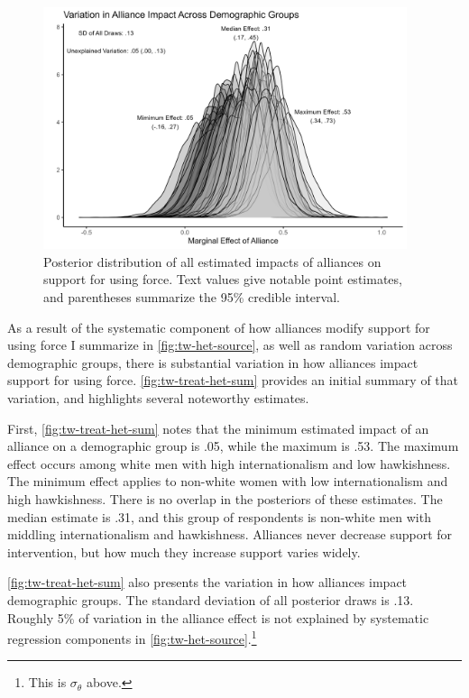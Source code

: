\documentclass[12pt]{article}
\begin{document}
\begin{figure}[htpb]
	\centering
		\includegraphics[width=0.95\textwidth]{../figures/tw-treat-het-sum.png}
	\caption{Posterior distribution of all estimated impacts of alliances on support for using force. Text values give notable point estimates, and parentheses summarize the 95\% credible interval.}
	\label{fig:tw-treat-het-sum}
\end{figure}


As a result of the systematic component of how alliances modify support for using force I summarize in \autoref{fig:tw-het-source}, as well as random variation across demographic groups, there is substantial variation in how alliances impact support for using force. 
\autoref{fig:tw-treat-het-sum} provides an initial summary of that variation, and highlights several noteworthy estimates. 


First, \autoref{fig:tw-treat-het-sum} notes that the minimum estimated impact of an alliance on a demographic group is .05, while the maximum is .53. 
The maximum effect occurs among white men with high internationalism and low hawkishness.
The minimum effect applies to non-white women with low internationalism and high hawkishness. 
There is no overlap in the posteriors of these estimates. 
The median estimate is .31, and this group of respondents is non-white men with middling internationalism and hawkishness. 
Alliances never decrease support for intervention, but how much they increase support varies widely. 


\autoref{fig:tw-treat-het-sum} also presents the variation in how alliances impact demographic groups. 
The standard deviation of all posterior draws is .13. 
Roughly 5\% of variation in the alliance effect is not explained by systematic regression components in \autoref{fig:tw-het-source}.\footnote{This is $\sigma_\theta$ above.}
\end{document}
